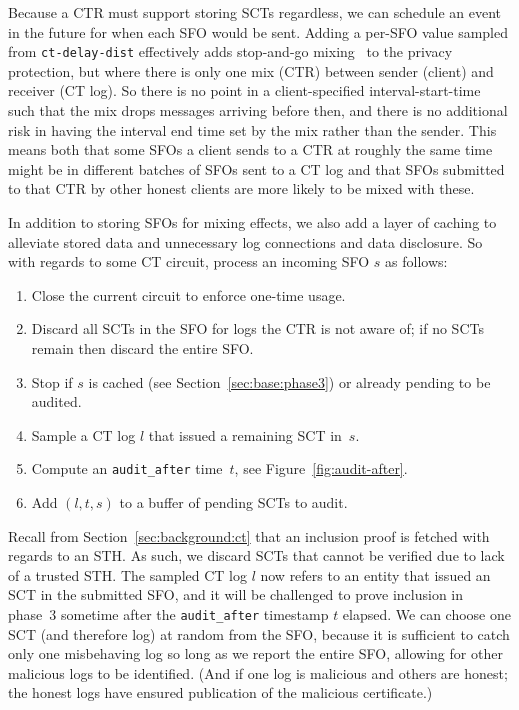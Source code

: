 Because a CTR must support storing SCTs regardless, we can schedule an event in the
future for when each SFO would be sent. 
Adding a per-SFO value sampled from \texttt{ct-delay-dist}
effectively adds stop-and-go mixing~\cite{kesdogan:ih1998} to the
privacy protection, but where there is only one mix (CTR) between
sender (client) and receiver (CT log). So there is no point in a
client-specified interval-start-time such that the mix drops messages
arriving before then, and there is no additional risk in having the
interval end time set by the mix rather than the sender. This means
both that some SFOs a client sends to a CTR at roughly the same time
might be in different batches of SFOs sent to a CT log and that SFOs
submitted to that CTR by other honest clients are more likely to be
mixed with these.


In addition to storing SFOs for mixing effects, we also add a layer of caching to
alleviate stored data and unnecessary log connections and data disclosure. So with
regards to some CT circuit, process an incoming SFO $s$ as follows:
\begin{enumerate}
    \item\label{enm:storage:close} Close the current circuit to enforce one-time
        usage.
    \item\label{enm:storage:unrecognized} Discard all SCTs in the SFO for logs the
        CTR is not aware of; if no SCTs remain then discard the entire SFO\@.
    \item\label{enm:storage:cached}
        Stop if $s$ is cached (see Section~\ref{sec:base:phase3}) or already
        pending to be audited.
    \item\label{enm:storage:fix-log} Sample a CT log $l$ that issued a
        remaining SCT in~$s$.
    \item\label{enm:storage:audit-after} Compute an \texttt{audit\_after}
		time~$t$, see Figure~\ref{fig:audit-after}.
    \item\label{enm:storage:store} Add $(l,t,s)$ to a buffer of pending SCTs to audit.
\end{enumerate}

Recall from Section~\ref{sec:background:ct} that an inclusion proof is fetched
with regards to an STH\@.  As such, we discard SCTs that cannot be verified due to
lack of a trusted STH\@.  The sampled CT log $l$ now refers to an entity that issued an
SCT in the submitted SFO, and it will be challenged to prove inclusion in phase~3
sometime after the \texttt{audit\_after} timestamp $t$ elapsed. We can choose one
SCT (and therefore log) at random from the SFO, because it is sufficient to catch
only one misbehaving log so long as we report the entire SFO, allowing for other
malicious logs to be identified. (And if one log is malicious and others are honest; the
honest logs have ensured publication of the malicious certificate.)

